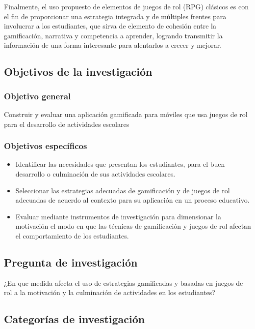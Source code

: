 Finalmente, el uso propuesto de elementos de juegos de rol (RPG) clásicos es con el fin de proporcionar una 
estrategia integrada y de múltiples frentes para involucrar a los estudiantes, que sirva de elemento de 
cohesión entre la gamificación, narrativa y competencia a aprender, logrando transmitir la información de
una forma interesante para alentarlos a crecer y mejorar.

\subsection{Objetivos de la investigación}

\subsubsection{Objetivo general}

Construir y evaluar una aplicación gamificada para móviles que usa juegos de rol para el desarrollo de 
actividades escolares

\subsubsection{Objetivos específicos}

\begin{itemize}
\item Identificar las necesidades que presentan los estudiantes, para el buen desarrollo o culminación de sus
actividades escolares.

\item Seleccionar las estrategias adecuadas de gamificación y de juegos de rol adecuadas de acuerdo al 
contexto para su aplicación en un proceso educativo.

\item Evaluar mediante instrumentos de investigación para dimensionar la motivación el modo en que las 
técnicas de gamificación y juegos de rol afectan el comportamiento de los estudiantes.
\end{itemize}

\subsection{Pregunta de investigación}

¿En que medida afecta el uso de estrategias gamificadas y basadas en juegos de rol a la motivación y la
culminación de actividades en los estudiantes?

\subsection{Categorías de investigación}

